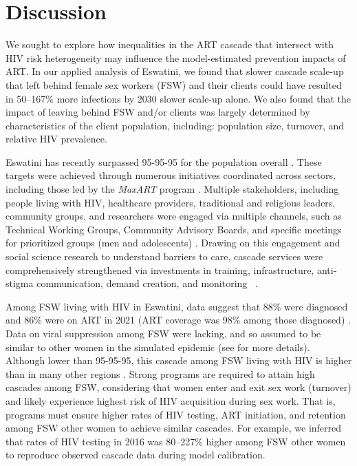 \section{Discussion}\label{art.disc}
We sought to explore how inequalities in the ART cascade
that intersect with HIV risk heterogeneity
may influence the model-estimated prevention impacts of ART.
In our applied analysis of Eswatini, we found that
slower cascade scale-up that left behind female sex workers (FSW) and their clients
could have resulted in 50--167\% more infections by 2030 \vs slower scale-up alone.
We also found that the impact of
leaving behind FSW and/or clients was largely determined by
characteristics of the client population, including:
population size, turnover, and relative HIV prevalence.
\par
Eswatini has recently surpassed 95-95-95 for the population overall \cite{SHIMS3}.
These targets were achieved through
numerous initiatives coordinated across sectors,
including those led by the \emph{MaxART} program \cite{MaxART2}.
Multiple stakeholders, including people living with HIV, healthcare providers,
traditional and religious leaders, community groups, and researchers
were engaged via multiple channels, such as
Technical Working Groups, Community Advisory Boards,
and specific meetings for prioritized groups (men and adolescents) \cite{MaxART2}.
Drawing on this engagement and
social science research to understand barriers to care,
cascade services were comprehensively strengthened via investments in
training, infrastructure, anti-stigma communication, demand creation, and monitoring~%
\cite{MaxART2}.
\par
Among FSW living with HIV in Eswatini, data suggest that
88\% were diagnosed and 86\% were on ART in 2021
(\ie ART coverage was 98\% among those diagnosed) \cite{EswIBBS2022}.
Data on viral suppression among FSW were lacking,
and so assumed to be similar to other women in the simulated epidemic
(see  for more details).
Although lower than 95-95-95, this cascade among FSW living with HIV
is higher than in many other regions \cite{Schwartz2017,Hakim2018}.
Strong programs are required to attain high cascades among FSW,
considering that women enter and exit sex work (turnover) and
likely experience highest risk of HIV acquisition during sex work.
That is, programs must ensure higher rates of HIV testing, ART initiation, and retention
among FSW \vs other women to achieve similar cascades.
For example, we inferred that rates of HIV testing in 2016 was 80--227\% higher
among FSW \vs other women to reproduce observed cascade data during model calibration.
